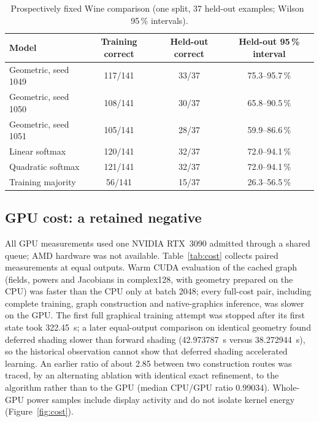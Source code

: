 \documentclass[11pt,a4paper]{article}
\begin{document}
\begin{table}[t]
\centering
\caption{Prospectively fixed Wine comparison (one split, 37 held-out examples; Wilson~\cite{wilson1927} 95\,\% intervals).}
\label{tab:wine}
\small
\begin{tabular}{@{}lccc@{}}
\toprule
Model & Training correct & Held-out correct & Held-out 95\,\% interval \\
\midrule
Geometric, seed 1049 & 117/141 & 33/37 & 75.3--95.7\,\% \\
Geometric, seed 1050 & 108/141 & 30/37 & 65.8--90.5\,\% \\
Geometric, seed 1051 & 105/141 & 28/37 & 59.9--86.6\,\% \\
Linear softmax & 120/141 & 32/37 & 72.0--94.1\,\% \\
Quadratic softmax & 121/141 & 32/37 & 72.0--94.1\,\% \\
Training majority & 56/141 & 15/37 & 26.3--56.5\,\% \\
\bottomrule
\end{tabular}
\end{table}

\subsection{GPU cost: a retained negative}
All GPU measurements used one NVIDIA RTX~3090 admitted through a shared queue; AMD hardware was not available. Table~\ref{tab:cost} collects paired measurements at equal outputs. Warm CUDA evaluation of the cached graph (fields, powers and Jacobians in complex128, with geometry prepared on the CPU) was faster than the CPU only at batch 2048; every full-cost pair, including complete training, graph construction and native-graphics inference, was slower on the GPU. The first full graphical training attempt was stopped after its first state took \SI{322.45}{s}; a later equal-output comparison on identical geometry found deferred shading slower than forward shading (\SI{42.973787}{s} versus \SI{38.272944}{s}), so the historical observation cannot show that deferred shading accelerated learning. An earlier ratio of about 2.85 between two construction routes was traced, by an alternating ablation with identical exact refinement, to the algorithm rather than to the GPU (median CPU/GPU ratio 0.99034). Whole-GPU power samples include display activity and do not isolate kernel energy (Figure~\ref{fig:cost}).
\end{document}
